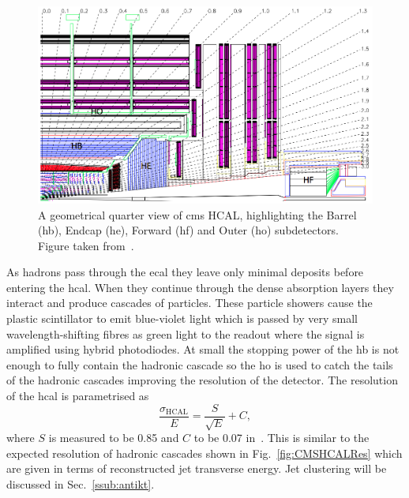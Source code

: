 \begin{figure}[htpb]
	\centering
	\includegraphics[width=\textwidth]{Figures/CMSHCAL}
	\caption[A geometrical quarter view of \acrshort{cms} HCAL, highlighting the Barrel (\acrshort{hb}), Endcap (\acrshort{he}), Forward (\acrshort{hf}) and Outer (\acrshort{ho}) subdetectors.]{A geometrical quarter view of \acrshort{cms} HCAL, highlighting the Barrel (\acrshort{hb}), Endcap (\acrshort{he}), Forward (\acrshort{hf}) and Outer (\acrshort{ho}) subdetectors. Figure taken from~\cite{CMSExperiment}.}
	\label{fig:CMSHCAL}
\end{figure}

As hadrons pass through the \acrshort{ecal} they leave only minimal deposits before entering the \acrshort{hcal}. 
When they continue through the dense absorption layers they interact and produce cascades of particles. 
These particle showers cause the plastic scintillator to emit blue-violet light which is passed by very small wavelength-shifting fibres as green light to the readout where the signal is amplified using hybrid photodiodes.
At small \abseta{} the stopping power of the \acrshort{hb} is not enough to fully contain the hadronic cascade so the \acrshort{ho} is used to catch the tails of the hadronic cascades improving the \ptmiss{} resolution of the detector.
The resolution of the \acrshort{hcal} is parametrised as 
\begin{equation}
	\frac{\sigma_{\mathrm{HCAL}}}{E} = \frac{S}{\sqrt{E}} + C,
\end{equation}
where $S$ is measured to be 0.85 and $C$ to be 0.07 in~\cite{CMS:HCALRES}.
This is similar to the expected resolution of hadronic cascades shown in Fig.~\ref{fig:CMSHCALRes} which are given in terms of reconstructed jet transverse energy.
Jet clustering will be discussed in Sec.~\ref{ssub:antikt}.

